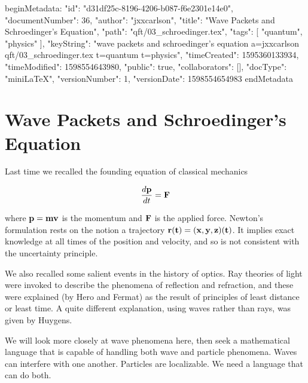 beginMetadata:
{
    "id": "d31df25c-8196-4206-b087-f6e2301e14e0",
    "documentNumber": 36,
    "author": "jxxcarlson",
    "title": "Wave Packets and Schroedinger's Equation",
    "path": "qft/03_schroedinger.tex",
    "tags": [
        "quantum",
        "physics"
    ],
    "keyString": "wave packets and schroedinger's equation a=jxxcarlson qft/03_schroedinger.tex t=quantum t=physics",
    "timeCreated": 1595360133934,
    "timeModified": 1598554643980,
    "public": true,
    "collaborators": [],
    "docType": "miniLaTeX",
    "versionNumber": 1,
    "versionDate": 1598554654983
}
endMetadata
\begin{mathmacro}
\newcommand{\bop}[0]{\bf{p}}
\newcommand{\boF}[0]{\bf{F}}
\newcommand{\bor}[0]{\bf{r}}
\newcommand{\bov}[0]{\bf{v}}
\end{mathmacro}

\setcounter{section}{3}


\section{Wave Packets and Schroedinger's Equation}




Last time we recalled the founding equation of classical mechanics

\begin{equation}
\frac{d \bf{p} }{dt} = \boF
\end{equation}

where $\bop = m\bov $ is the momentum and $\boF $  is the applied force.  Newton's formulation rests on the notion a trajectory $\bor(t) = (x,y,z)(t)$.  It implies exact knowledge at all times of the position and velocity, and so is not consistent with the uncertainty principle.

We also recalled some salient events in the history of optics. Ray theories of light were invoked to describe the phenomena of reflection and refraction, and these were explained (by Hero and Fermat) as the result of principles of least distance or least time.  A quite different explanation, using waves rather than rays, was given by Huygens. 

We will look more closely at wave phenomena here, then seek a mathematical language that is capable of handling both wave and particle phenomena.  Waves can interfere with one another.  Particles are localizable. We need a language that can do both.

